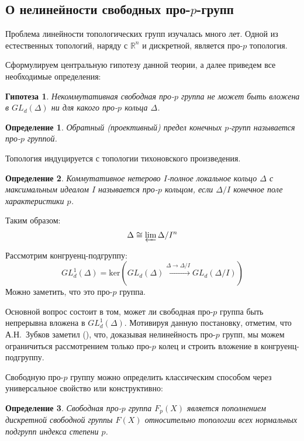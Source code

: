 \documentclass[12pt,a4paper]{article}
\newtheorem{definition}{Определение}[section]
\newtheorem{conjecture}{Гипотеза}[section]
\begin{document}
    \subsection{О нелинейности свободных про-$p$-групп}
    Проблема линейности топологических групп изучалась много лет.
    Одной из естественных топологий, наряду с $\mathbb{R}^n$ и дискретной, является про-$p$ топология.

    Сформулируем центральную гипотезу данной теории, а далее приведем все необходимые определения:

    \vskip 0.1in\noindent
    \begin{conjecture}
        Некоммутативная свободная про-$p$ группа не может быть вложена в $GL_d(\Delta)$ ни для какого про-$p$ кольца $\Delta$.
    \end{conjecture}
    \vskip 0.1in\noindent

    \vskip 0.1in\noindent
    \begin{definition}
        Обратный (проективный) предел конечных $p$-групп называется про-$p$ группой.
    \end{definition}
    \vskip 0.1in\noindent
    Топология индуцируется с топологии тихоновского произведения.

    \vskip 0.1in\noindent
    \begin{definition}
        Коммутативное нетерово $I$-полное локальное кольцо $\Delta$ с максимальным идеалом $I$ называется про-$p$ кольцом, если $\Delta/I$ конечное поле характеристики $p$.
    \end{definition}
    \vskip 0.1in\noindent

    Таким образом:
    \[
        \Delta \cong \varprojlim \Delta/I^n
    \]

    Рассмотрим конгруенц-подгруппу:
    \[
        GL_d^1(\Delta) = \mathrm{ker}\left( GL_d(\Delta) \xrightarrow{\Delta\to\Delta/I} GL_d(\Delta/I) \right)
    \]
    Можно заметить, что это про-$p$ группа.


    Основной вопрос состоит в том, может ли свободная про-$p$ группа быть непрерывна вложена в $GL_d^1(\Delta)$.
    Мотивируя данную постановку, отметим, что А.Н.\ Зубков заметил (\cite{Zubkov}), что, доказывая нелинейность про-$p$ групп, мы можем ограничиться рассмотрением только про-$p$ колец и строить вложение в конгруенц-подгруппу.

    Свободную про-$p$ группу можно определить классическим способом через универсальное свойство или конструктивно:

    \vskip 0.1in\noindent
    \begin{definition}
        Свободная про-$p$ группа $F_p(X)$ является пополнением дискретной свободной группы $F(X)$ относительно топологии всех нормальных подгрупп индекса степени $p$.
    \end{definition}
    \vskip 0.1in\noindent
\end{document}
